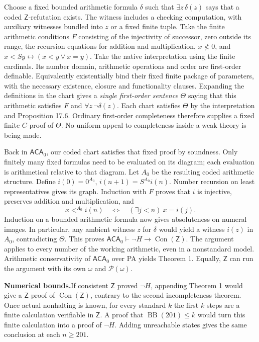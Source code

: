 \documentclass[10pt,a4paper]{article}
\newcommand{\Con}{\operatorname{Con}}\newcommand{\PA}{\mathsf{PA}}\newcommand{\PRA}{\mathsf{PRA}}\newcommand{\Z}{\mathsf{Z}}\newcommand{\NF}{\mathsf{NF}}\newcommand{\Ax}{\mathsf{AxCount}}\newcommand{\BB}{\operatorname{BB}}\newcommand{\ACA}{\mathsf{ACA}_0}
\newcommand{\shd}[1]{\par\textbf{#1}\enspace}
\begin{document}
Choose a fixed bounded arithmetic formula $\delta$ such that $\exists z\,\delta(z)$ says that a coded $\Z$-refutation exists. The witness includes a checking computation, with auxiliary witnesses bundled into $z$ or a fixed finite tuple. Take the finite arithmetic conditions $F$ consisting of the injectivity of successor, zero outside its range, the recursion equations for addition and multiplication, $x\nless 0$, and $x<Sy\leftrightarrow(x<y\lor x=y)$. Take the native interpretation using the finite cardinals. Its number domain, arithmetic operations and order are first-order definable. Equivalently existentially bind their fixed finite package of parameters, with the necessary existence, closure and functionality clauses. Expanding the definitions in the chart gives a \emph{single first-order sentence} $\Theta$ saying that this arithmetic satisfies $F$ and $\forall z\,\neg\delta(z)$. Each chart satisfies $\Theta$ by the interpretation and Proposition 17.6. Ordinary first-order completeness therefore supplies a fixed finite $C$-proof of $\Theta$. No uniform appeal to completeness inside a weak theory is being made.

Back in $\ACA$, our coded chart satisfies that fixed proof by soundness. Only finitely many fixed formulas need to be evaluated on its diagram; each evaluation is arithmetical relative to that diagram. Let $A_0$ be the resulting coded arithmetic structure. Define $i(0)=0^{A_0}$, $i(n+1)=S^{A_0}i(n)$. Number recursion on least representatives gives its graph. Induction with $F$ proves that $i$ is injective, preserves addition and multiplication, and
\[
               x<^{A_0}i(n)\quad\Longleftrightarrow\quad
                       (\exists j<n)\ x=i(j).
\]
Induction on a bounded arithmetic formula now gives absoluteness on numeral images. In particular, any ambient witness $z$ for $\delta$ would yield a witness $i(z)$ in $A_0$, contradicting $\Theta$. This proves $\ACA\vdash\neg H\to\Con(\Z)$. The argument applies to every number of the working arithmetic, even in a nonstandard model. Arithmetic conservativity of $\ACA$ over PA yields Theorem 1. Equally, $\Z$ can run the argument with its own $\omega$ and $\mathcal P(\omega)$.

\shd{Numerical bounds.}If consistent $\Z$ proved $\neg H$, appending Theorem 1 would give a $\Z$ proof of $\Con(\Z)$, contrary to the second incompleteness theorem. Once actual nonhalting is known, for every standard $k$ the first $k$ steps are a finite calculation verifiable in $\Z$. A proof that $\BB(201)\le k$ would turn this finite calculation into a proof of $\neg H$. Adding unreachable states gives the same conclusion at each $n\ge201$.
\newpage
\end{document}
